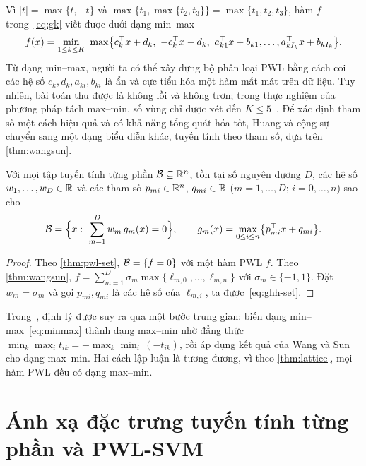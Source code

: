 Vì $|t|=\max\{t,-t\}$ và $\max\{t_1,\max\{t_2,t_3\}\}=\max\{t_1,t_2,t_3\}$, hàm $f$ trong~\eqref{eq:gk} viết được dưới dạng min--max
\begin{equation}\label{eq:minmax}
f(x)=\min_{1\le k\le K}\ \max\bigl\{c_k^\T x+d_k,\ -c_k^\T x-d_k,\ a_{k1}^\T x+b_{k1},\dots,a_{kI_k}^\T x+b_{kI_k}\bigr\}.
\end{equation}
Từ dạng min--max, người ta có thể xây dựng bộ phân loại PWL bằng cách coi các hệ số $c_k,d_k,a_{ki},b_{ki}$ là ẩn và cực tiểu hóa một hàm mất mát trên dữ liệu. Tuy nhiên, bài toán thu được là không lồi và không trơn; trong thực nghiệm của phương pháp tách max--min, số vùng chỉ được xét đến $K\le5$~\cite{bagirov2005}. Để xác định tham số một cách hiệu quả và có khả năng tổng quát hóa tốt, Huang và cộng sự chuyển sang một dạng biểu diễn khác, tuyến tính theo tham số, dựa trên \cref{thm:wangsun}.

\begin{theorem}\label{thm:ghh-set}
Với mọi tập tuyến tính từng phần $\mathcal{B}\subseteq\mathbb{R}^n$, tồn tại số nguyên dương $D$, các hệ số $w_1,\dots,w_D\in\mathbb{R}$ và các tham số $p_{mi}\in\mathbb{R}^n$, $q_{mi}\in\mathbb{R}$ ($m=1,\dots,D$; $i=0,\dots,n$) sao cho
\begin{equation}\label{eq:ghh-set}
\mathcal{B}=\Bigl\{x:\ \sum_{m=1}^{D}w_m\,g_m(x)=0\Bigr\},\qquad
g_m(x)=\max_{0\le i\le n}\bigl\{p_{mi}^\top x+q_{mi}\bigr\}.
\end{equation}
\end{theorem}

\begin{proof}
Theo \cref{thm:pwl-set}, $\mathcal{B}=\{f=0\}$ với một hàm PWL $f$. Theo \cref{thm:wangsun}, $f=\sum_{m=1}^{D}\sigma_m\max\{\ell_{m,0},\dots,\ell_{m,n}\}$ với $\sigma_m\in\{-1,1\}$. Đặt $w_m=\sigma_m$ và gọi $p_{mi},q_{mi}$ là các hệ số của $\ell_{m,i}$, ta được~\eqref{eq:ghh-set}.
\end{proof}

Trong~\cite{huang2013}, định lý được suy ra qua một bước trung gian: biến dạng min--max~\eqref{eq:minmax} thành dạng max--min nhờ đẳng thức
$\min_k\max_i t_{ik}=-\max_k\min_i\,(-t_{ik})$,
rồi áp dụng kết quả của Wang và Sun cho dạng max--min. Hai cách lập luận là tương đương, vì theo \cref{thm:lattice}, mọi hàm PWL đều có dạng max--min.

\section{Ánh xạ đặc trưng tuyến tính từng phần và PWL-SVM}\label{sec:pwlsvm}

